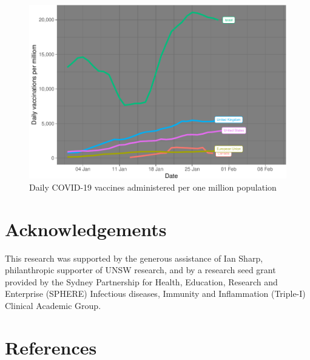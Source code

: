 \documentclass{article}
\begin{document}
\begin{figure}

{\centering \includegraphics{researchNote_files/figure-latex/dailyVac-1} 

}

\caption{Daily COVID-19 vaccines administered per one million population}\label{fig:dailyVac}
\end{figure}

\hypertarget{acknowledgements}{%
\section{Acknowledgements}\label{acknowledgements}}

This research was supported by the generous assistance of Ian Sharp,
philanthropic supporter of UNSW research, and by a research seed grant
provided by the Sydney Partnership for Health, Education, Research and
Enterprise (SPHERE) Infectious diseases, Immunity and Inflammation
(Triple-I) Clinical Academic Group.

\newpage

\hypertarget{references}{%
\section*{References}\label{references}}
\end{document}
